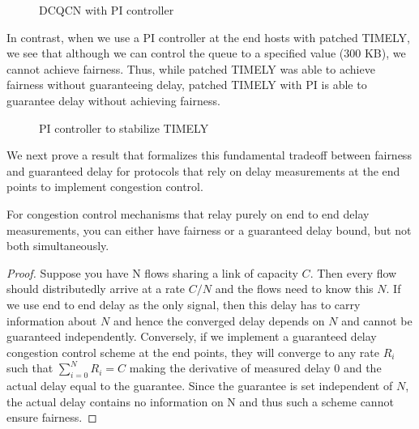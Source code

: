 \begin{figure}
\caption{DCQCN with PI controller}
\label{fig:dcqcn_pi}
\end{figure}

In contrast, when we use a PI controller at the end hosts with patched
TIMELY, we see that although we can control the queue
to a specified value (300 KB), we cannot achieve fairness. Thus, while
patched TIMELY was able to achieve fairness without guaranteeing
delay, patched TIMELY with PI is able to guarantee delay without
achieving fairness.
\begin{figure}
\center
{}
\caption{PI controller to stabilize TIMELY}
\label{fig:timely_pi}
\end{figure}

We next prove a result that formalizes this fundamental tradeoff between fairness
and guaranteed delay for protocols that rely on delay measurements at the end
points to implement congestion control.

\begin{thm}
\label{thm:fairness-delay}
For congestion control mechanisms that relay purely on end to end
delay measurements, you can either have fairness or a guaranteed delay
bound, but not both simultaneously.
\end{thm}
\begin{proof}
Suppose you have N flows sharing a link of capacity $C$. Then every flow
should distributedly arrive at a rate $C/N$ and the flows need to know
this $N$. If we use end to end delay as the only signal, then this delay
has to carry information about $N$ and hence the converged delay
depends on $N$ and cannot be guaranteed independently. Conversely, if we implement a guaranteed delay congestion
control scheme at the end points, they
will converge to any rate $R_i$ such that $\sum_{i=0}^{N}R_i = C$
making the derivative of measured delay 0 and the actual delay equal
to the guarantee. Since the guarantee is set independent of $N$, the
actual delay contains no information on N and 
thus such a scheme cannot ensure fairness.
\end{proof}

